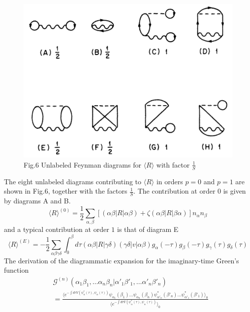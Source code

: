 \documentclass[12pt]{article}
\begin{document}
\begin{figure}[H]
    \centering
    \includegraphics[width=12cm]{p14.png}
    \caption*{Fig.6 Unlabeled Feynman diagrams for $\langle R\rangle$ with 
    factor $\frac{1}{S}$}
    \label{}
\end{figure}
The eight unlabeled diagrams contributing to $\langle R\rangle$ in orders $p=0$ 
and $p=1$ are shown in Fig.6, together with the factors $\frac{1}{S}$. The 
contribution at order $0$ is given by diagrams A and B. 
\begin{equation*}
    \langle R\rangle^{(0)}=\frac{1}{2}\sum_{\alpha,\beta}[(\alpha\beta|R|
    \alpha\beta)+\zeta(\alpha\beta|R|\beta\alpha)]n_\alpha n_\beta
\end{equation*}
and a typical contribution at order $1$ is that of diagram E
\begin{equation*}
    \langle R\rangle^{(E)}=-\frac{1}{2}\sum_{\alpha\beta\gamma\delta}
    \int_0^\beta d\tau(\alpha\beta|R|\gamma\delta)(\gamma\delta|v|\alpha\beta)
    g_\alpha(-\tau)g_\beta(-\tau)g_\gamma(\tau)g_\delta(\tau)
\end{equation*}
The derivation of the diagrammatic expansion for the imaginary-time Green's 
function 
\begin{equation*}
    \begin{split}
        &\mathcal{G}^{(n)}(\alpha_1\beta_1,\dots\alpha_n\beta_n|\alpha'_1\beta'_1,
        \dots\alpha'_n\beta'_n)\\
        &=\frac{\langle e^{-\int d\tau V(\psi_\alpha^*(\tau),
        \psi_\alpha(\tau))}\psi_{\alpha_1}(\beta_1)\dots\psi_{\alpha_n}(\beta_n)
        \psi^*_{\alpha'_n}(\beta'_n)\dots\psi^*_{\alpha'_1}(\beta'_1)\rangle_0}
        {\langle e^{-\int d\tau V(\psi_\alpha^*(\tau),\psi_\alpha(\tau))}\rangle_0}
    \end{split}
\end{equation*}
\end{document}

